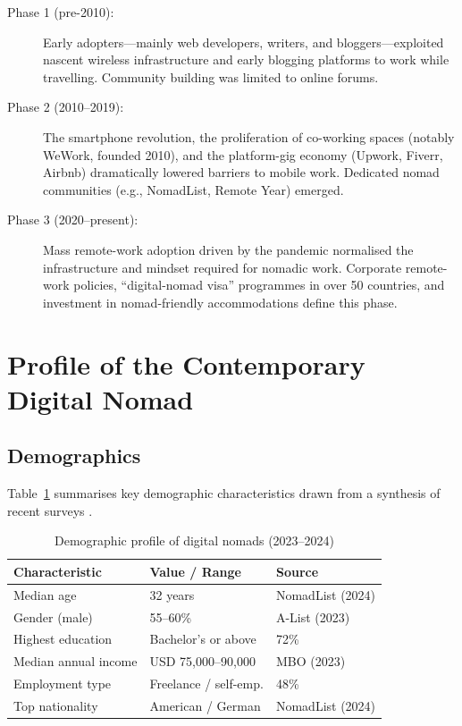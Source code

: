 \documentclass[12pt,a4paper]{article}
\begin{document}
\begin{description}
  \item[Phase 1 (pre-2010):] Early adopters—mainly web developers, writers, and
        bloggers—exploited nascent wireless infrastructure and early blogging
        platforms to work while travelling. Community building was limited to
        online forums.

  \item[Phase 2 (2010–2019):] The smartphone revolution, the proliferation of
        co-working spaces (notably WeWork, founded 2010), and the platform-gig
        economy (Upwork, Fiverr, Airbnb) dramatically lowered barriers to
        mobile work. Dedicated nomad communities (e.g., NomadList, Remote Year)
        emerged.

  \item[Phase 3 (2020–present):] Mass remote-work adoption driven by the
        pandemic normalised the infrastructure and mindset required for nomadic
        work. Corporate remote-work policies, ``digital-nomad visa'' programmes
        in over 50 countries, and investment in nomad-friendly accommodations
        define this phase.
\end{description}

\section{Profile of the Contemporary Digital Nomad}
\label{sec:profile}

\subsection{Demographics}

Table~\ref{tab:demographics} summarises key demographic characteristics drawn
from a synthesis of recent surveys
\citep{A-List2023,NomadList2024,Statista2024}.

\begin{table}[H]
  \centering
  \caption{Demographic profile of digital nomads (2023–2024)}
  \label{tab:demographics}
  \begin{tabular}{lll}
    \toprule
    \textbf{Characteristic} & \textbf{Value / Range} & \textbf{Source} \\
    \midrule
    Median age              & 32 years             & NomadList (2024) \\
    Gender (male)           & 55–60\%              & A-List (2023)    \\
    Highest education       & Bachelor's or above  & 72\%             \\
    Median annual income    & USD 75,000–90,000    & MBO (2023)       \\
    Employment type         & Freelance / self-emp.& 48\%             \\
    Top nationality         & American / German    & NomadList (2024) \\
    \bottomrule
  \end{tabular}
\end{table}
\end{document}
